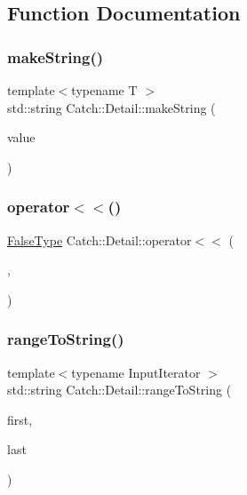 \subsection{Function Documentation}
\mbox{\label{namespace_catch_1_1_detail_aef46b4178e08758524d25d1d969a503c}} 
\subsubsection{\texorpdfstring{make\+String()}{makeString()}}
{\footnotesize\ttfamily template$<$typename T $>$ \\
std\+::string Catch\+::\+Detail\+::make\+String (\begin{DoxyParamCaption}\item[{T const \&}]{value }\end{DoxyParamCaption})}

\mbox{\label{namespace_catch_1_1_detail_ae9a44d574c4fbd18fabaaee05a433d88}} 
\subsubsection{\texorpdfstring{operator$<$$<$()}{operator<<()}}
{\footnotesize\ttfamily \mbox{\hyperlink{struct_catch_1_1_detail_1_1_false_type}{False\+Type}} Catch\+::\+Detail\+::operator$<$$<$ (\begin{DoxyParamCaption}\item[{std\+::ostream const \&}]{,  }\item[{\mbox{\hyperlink{struct_catch_1_1_detail_1_1_borg_type}{Borg\+Type}} const \&}]{ }\end{DoxyParamCaption})}

\mbox{\label{namespace_catch_1_1_detail_a6650a1dff325bf29962ff15ae73fd972}} 
\subsubsection{\texorpdfstring{range\+To\+String()}{rangeToString()}}
{\footnotesize\ttfamily template$<$typename Input\+Iterator $>$ \\
std\+::string Catch\+::\+Detail\+::range\+To\+String (\begin{DoxyParamCaption}\item[{Input\+Iterator}]{first,  }\item[{Input\+Iterator}]{last }\end{DoxyParamCaption})}

